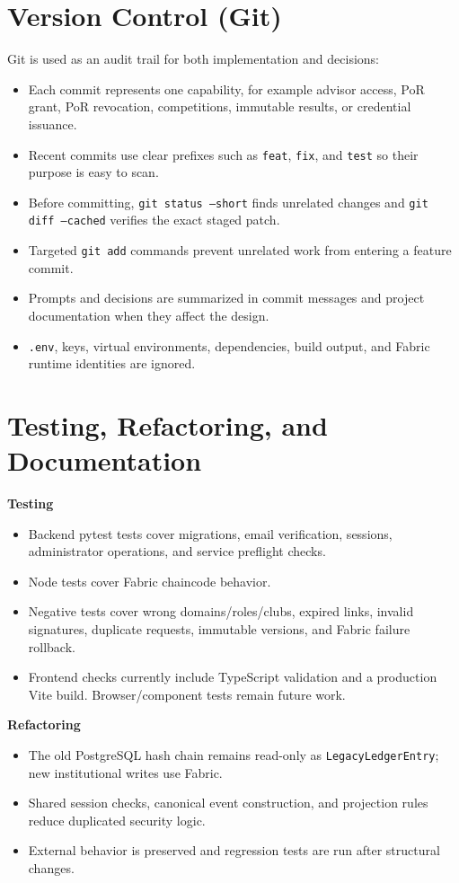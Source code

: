 \documentclass[10pt,a4paper]{article}
\begin{document}
\section{Version Control (Git)}

Git is used as an audit trail for both implementation and decisions:

\begin{itemize}
  \item Each commit represents one capability, for example advisor access, PoR grant, PoR revocation, competitions, immutable results, or credential issuance.
  \item Recent commits use clear prefixes such as \texttt{feat}, \texttt{fix}, and \texttt{test} so their purpose is easy to scan.
  \item Before committing, \texttt{git status --short} finds unrelated changes and \texttt{git diff --cached} verifies the exact staged patch.
  \item Targeted \texttt{git add} commands prevent unrelated work from entering a feature commit.
  \item Prompts and decisions are summarized in commit messages and project documentation when they affect the design.
  \item \texttt{.env}, keys, virtual environments, dependencies, build output, and Fabric runtime identities are ignored.
\end{itemize}

\section{Testing, Refactoring, and Documentation}

\textbf{Testing}
\begin{itemize}
  \item Backend pytest tests cover migrations, email verification, sessions, administrator operations, and service preflight checks.
  \item Node tests cover Fabric chaincode behavior.
  \item Negative tests cover wrong domains/roles/clubs, expired links, invalid signatures, duplicate requests, immutable versions, and Fabric failure rollback.
  \item Frontend checks currently include TypeScript validation and a production Vite build. Browser/component tests remain future work.
\end{itemize}

\textbf{Refactoring}
\begin{itemize}
  \item The old PostgreSQL hash chain remains read-only as \texttt{LegacyLedgerEntry}; new institutional writes use Fabric.
  \item Shared session checks, canonical event construction, and projection rules reduce duplicated security logic.
  \item External behavior is preserved and regression tests are run after structural changes.
\end{itemize}
\end{document}
